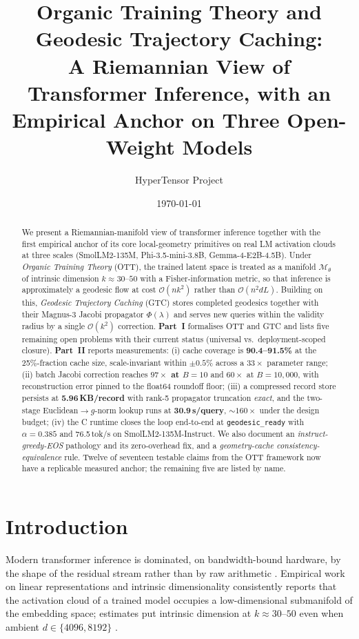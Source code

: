 \documentclass[11pt]{article}
\title{Organic Training Theory and Geodesic Trajectory Caching:\\
A Riemannian View of Transformer Inference, with an Empirical Anchor on Three Open-Weight Models}
\author{HyperTensor Project}
\date{\today}
\begin{document}
\maketitle

\begin{abstract}
We present a Riemannian-manifold view of transformer inference together with the
first empirical anchor of its core local-geometry primitives on real LM activation
clouds at three scales (SmolLM2-135M, Phi-3.5-mini-3.8B, Gemma-4-E2B-4.5B).
Under \emph{Organic Training Theory} (OTT), the trained latent space is treated as
a manifold $\mathcal{M}_\theta$ of intrinsic dimension $k\!\approx\!30$--$50$ with
a Fisher-information metric, so that inference is approximately a geodesic flow at
cost $\mathcal{O}(nk^2)$ rather than $\mathcal{O}(n^2 dL)$.
Building on this, \emph{Geodesic Trajectory Caching} (GTC) stores completed
geodesics together with their Magnus-3 Jacobi propagator $\Phi(\lambda)$ and
serves new queries within the validity radius by a single $\mathcal{O}(k^2)$
correction. \textbf{Part~I} formalises OTT and GTC and lists five remaining open
problems with their current status (universal vs.\ deployment-scoped closure).
\textbf{Part~II} reports measurements: (i) cache coverage is
\textbf{90.4--91.5\%} at the 25\%-fraction cache size, scale-invariant within
$\pm 0.5\%$ across a $33\times$ parameter range; (ii) batch Jacobi correction
reaches \textbf{$97\times$ at $B=10$} and $60\times$ at $B=10{,}000$, with
reconstruction error pinned to the float64 roundoff floor; (iii) a compressed
record store persists at \textbf{5.96\,KB/record} with rank-5 propagator
truncation \emph{exact}, and the two-stage Euclidean$\to g$-norm lookup runs at
\textbf{30.9\,\textmu s/query}, $\sim\!160\times$ under the design budget; (iv)
the C runtime closes the loop end-to-end at \texttt{geodesic\_ready} with
$\alpha=0.385$ and 76.5\,tok/s on SmolLM2-135M-Instruct. We also document an
\emph{instruct-greedy-EOS} pathology and its zero-overhead fix, and a
\emph{geometry-cache consistency-equivalence} rule. Twelve of seventeen testable
claims from the OTT framework now have a replicable measured anchor; the
remaining five are listed by name.
\end{abstract}

\section{Introduction}

Modern transformer inference is dominated, on bandwidth-bound hardware, by the
shape of the residual stream rather than by raw arithmetic
\cite{vaswani2017attention,llama3,williams2009roofline}. Empirical work on
linear representations and intrinsic dimensionality consistently reports that
the activation cloud of a trained model occupies a low-dimensional submanifold
of the embedding space; estimates put intrinsic dimension at $k\!\approx\!30$--$50$
even when ambient $d\in\{4096,8192\}$
\cite{elhage2022superposition,nakkiran2021deep}.
\end{document}
